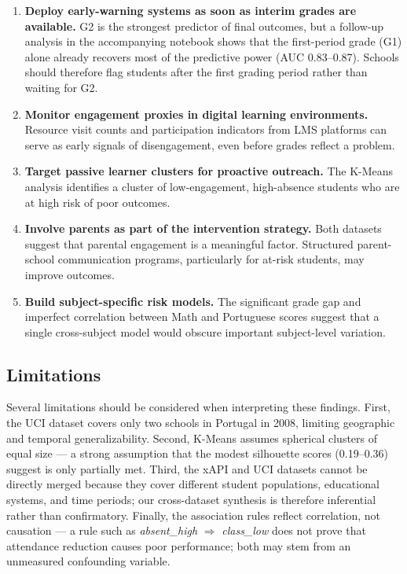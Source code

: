 \documentclass[conference]{IEEEtran}
\begin{document}
\begin{enumerate}
  \item \textbf{Deploy early-warning systems as soon as interim grades are available.} G2 is the strongest predictor of final outcomes, but a follow-up analysis in the accompanying notebook shows that the first-period grade (G1) alone already recovers most of the predictive power (AUC 0.83--0.87). Schools should therefore flag students after the first grading period rather than waiting for G2.
  \item \textbf{Monitor engagement proxies in digital learning environments.} Resource visit counts and participation indicators from LMS platforms can serve as early signals of disengagement, even before grades reflect a problem.
  \item \textbf{Target passive learner clusters for proactive outreach.} The K-Means analysis identifies a cluster of low-engagement, high-absence students who are at high risk of poor outcomes.
  \item \textbf{Involve parents as part of the intervention strategy.} Both datasets suggest that parental engagement is a meaningful factor. Structured parent-school communication programs, particularly for at-risk students, may improve outcomes.
  \item \textbf{Build subject-specific risk models.} The significant grade gap and imperfect correlation between Math and Portuguese scores suggest that a single cross-subject model would obscure important subject-level variation.
\end{enumerate}

\subsection{Limitations}

Several limitations should be considered when interpreting these findings. First, the UCI dataset covers only two schools in Portugal in 2008, limiting geographic and temporal generalizability. Second, K-Means assumes spherical clusters of equal size — a strong assumption that the modest silhouette scores (0.19–0.36) suggest is only partially met. Third, the xAPI and UCI datasets cannot be directly merged because they cover different student populations, educational systems, and time periods; our cross-dataset synthesis is therefore inferential rather than confirmatory. Finally, the association rules reflect correlation, not causation — a rule such as \textit{absent\_high} $\Rightarrow$ \textit{class\_low} does not prove that attendance reduction causes poor performance; both may stem from an unmeasured confounding variable.
\end{document}
